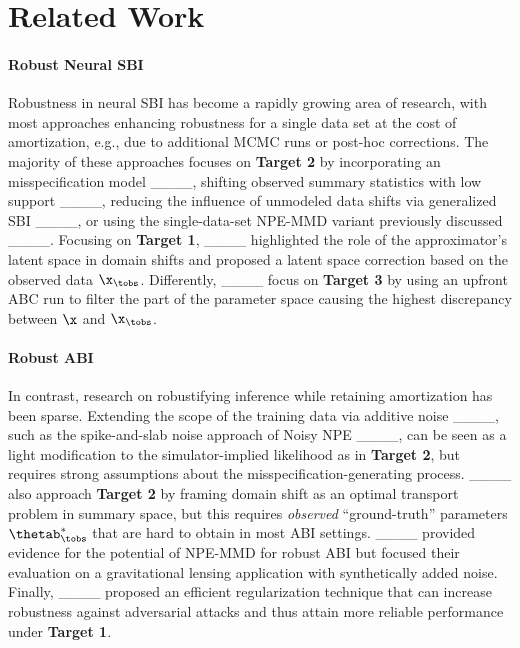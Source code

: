 \section{Related Work}
\label{sec:related_work}

\paragraph{Robust Neural SBI}
Robustness in neural SBI has become a rapidly growing area of research, with most approaches enhancing robustness for a single data set at the cost of amortization, e.g., due to additional MCMC runs or post-hoc corrections.
The majority of these approaches focuses on \textbf{Target 2} by incorporating an misspecification model ____, shifting observed summary statistics with low support ____, reducing the influence of unmodeled data shifts via generalized SBI ____, or using the single-data-set NPE-MMD variant previously discussed ____.
Focusing on \textbf{Target 1}, ____ highlighted the role of the approximator's latent space in domain shifts and proposed a latent space correction based on the observed data $\x_\tobs$.
Differently, ____ focus on \textbf{Target 3} by using an upfront ABC run to filter the part of the parameter space causing the highest discrepancy between $\x$ and $\x_\tobs$.

\paragraph{Robust ABI} 
In contrast, research on robustifying inference while retaining amortization has been sparse. 
Extending the scope of the training data via additive noise
____, such as the spike-and-slab noise approach of Noisy NPE ____, can be seen as a light modification to the simulator-implied likelihood as in \textbf{Target 2}, but requires strong assumptions about the misspecification-generating process.
____ also approach \textbf{Target 2} by framing domain shift as an optimal transport problem in summary space, but this requires \emph{observed} ``ground-truth'' parameters $\thetab_\tobs^*$ that are hard to obtain in most ABI settings.
____ provided evidence for the potential of NPE-MMD for robust ABI but focused their evaluation on a gravitational lensing application with synthetically added noise.
Finally, ____ proposed an efficient regularization technique that can increase robustness against adversarial attacks and thus attain more reliable performance under \textbf{Target 1}.